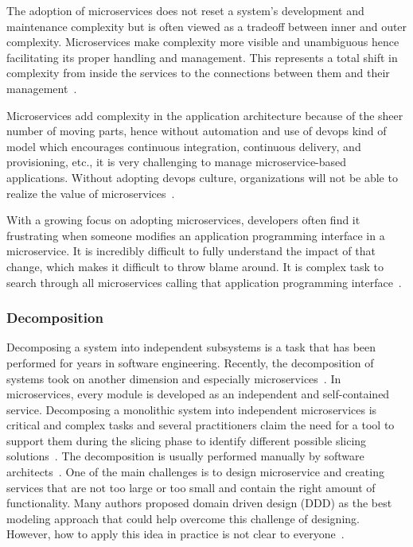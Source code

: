 \par The adoption of microservices does not reset a system's development and maintenance complexity but is often viewed as a tradeoff between inner and outer complexity. Microservices make complexity more visible and unambiguous hence facilitating its proper handling and management. This represents a total shift in complexity from inside the services to the connections between them and their management~\cite{Ndungu2019, gozneli2020}.

\par Microservices add complexity in the application architecture because of the sheer number of moving parts, hence without automation and use of devops kind of model which encourages continuous integration, continuous delivery, and provisioning, etc., it is very challenging to manage microservice-based applications. Without adopting devops culture, organizations will not be able to realize the value of microservices~\cite{Premchand2018}. 

\par With a growing focus on adopting microservices, developers often find it frustrating when someone modifies an application programming interface in a microservice. It is incredibly difficult to fully understand the impact of that change, which makes it difficult to throw blame around. It is complex task to search through all microservices calling that application programming interface~\cite{Branko2018}.


\subsubsection{Decomposition}%

Decomposing a system into independent subsystems is a task that has been performed for years in software engineering. Recently, the decomposition of systems took on another dimension and especially microservices~\cite{Fred2015, Netflix}. In microservices, every module is developed as an independent and self-contained service. Decomposing a monolithic system into independent microservices is critical and complex tasks and several practitioners claim the need for a tool to support them during the slicing phase to identify different possible slicing solutions~\cite{Taibi2019}. The decomposition is usually performed manually by software architects~\cite{Zhang2019, Carvalho2019}. 
One of the main challenges is to design microservice and creating services that are not too large or too small and contain the right amount of functionality. Many authors proposed domain driven design (DDD) as the best modeling approach that could help overcome this challenge of designing. However, how to apply this idea in practice is not clear to everyone~\cite{Merson2020}.

